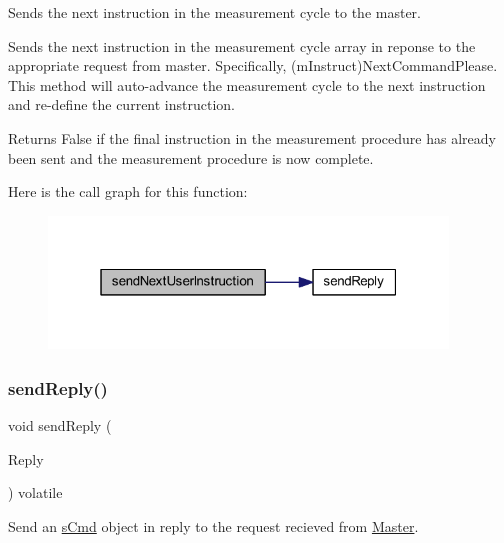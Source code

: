 Sends the next instruction in the measurement cycle to the master. 

Sends the next instruction in the measurement cycle array in reponse to the appropriate request from master. Specifically, (m\+Instruct)Next\+Command\+Please. This method will auto-\/advance the measurement cycle to the next instruction and re-\/define the \textquotesingle{}current instruction\textquotesingle{}. \begin{DoxyReturn}{Returns}
False if the final instruction in the measurement procedure has already been sent and the measurement procedure is now complete. 
\end{DoxyReturn}
Here is the call graph for this function\+:
\nopagebreak
\begin{figure}[H]
\begin{center}
\leavevmode
\includegraphics[width=301pt]{class_master_a6445732d38d6bac09ab8c8bd66bd4e2a_cgraph}
\end{center}
\end{figure}
\mbox{\label{class_master_a7d0570bae901dbbd7c88db131fea03c5}} 
\subsubsection{\texorpdfstring{sendReply()}{sendReply()}\hspace{0.1cm}{\footnotesize\ttfamily [1/9]}}
{\footnotesize\ttfamily void send\+Reply (\begin{DoxyParamCaption}\item[{const \mbox{\hyperlink{structs_cmd}{s\+Cmd}}}]{Reply }\end{DoxyParamCaption}) volatile}



Send an \mbox{\hyperlink{structs_cmd}{s\+Cmd}} object in reply to the request recieved from \mbox{\hyperlink{class_master}{Master}}. 

